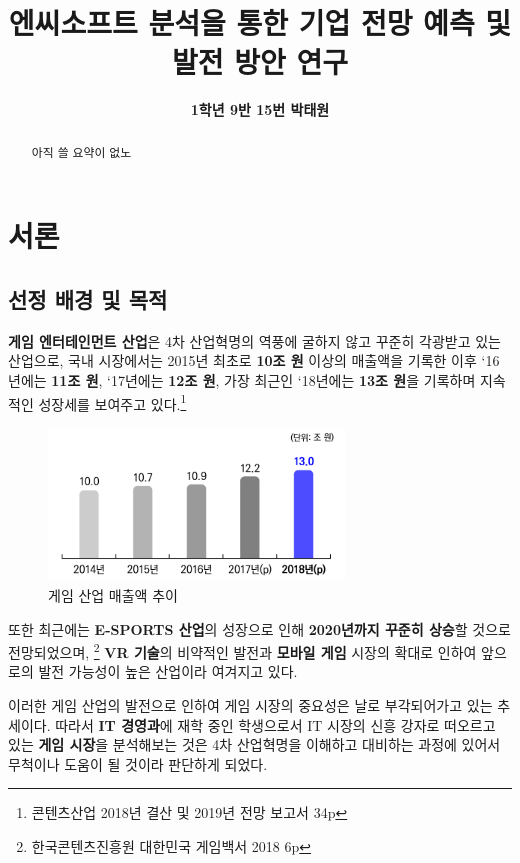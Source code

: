 \documentclass[11pt]{oblivoir}
\title{\textbf{엔씨소프트 분석을 통한 기업 전망 예측 및 발전 방안 연구}}
\author{\textbf{1학년 9반 15번 박태원}}
\begin{document}
	\begin{center}
		\maketitle
		\begin{abstract}
			아직 쓸 요약이 없노
		\end{abstract}
		\tableofcontents
		\pagebreak
	\end{center}
	
	
	\section{서론}
		\subsection{선정 배경 및 목적}
			\textbf{게임 엔터테인먼트 산업}은 4차 산업혁명의 역풍에 굴하지 않고 꾸준히 각광받고 있는 산업으로, 국내 시장에서는 2015년 최초로 \textbf{10조 원} 이상의 매출액을 기록한 이후 `16년에는 \textbf{11조 원}, `17년에는 \textbf{12조 원}, 가장 최근인 `18년에는 \textbf{13조 원}을 기록하며 지속적인 성장세를 보여주고 있다.\footnote{콘텐츠산업 2018년 결산 및 2019년 전망 보고서 34p}
			
			\begin{figure}[htbp]
				\centering
				\includegraphics[width=0.7\textwidth]{GameMaechul.png}
				\caption{게임 산업 매출액 추이}
			\end{figure}
			
			또한 최근에는 \textbf{E-SPORTS 산업}의 성장으로 인해 \textbf{2020년까지 꾸준히 상승}할 것으로 전망되었으며, \footnote{한국콘텐츠진흥원 대한민국 게임백서 2018 6p} 
			\textbf{VR 기술}의 비약적인 발전과 \textbf{모바일 게임} 시장의 확대로 인하여 앞으로의 발전 가능성이 높은 산업이라 여겨지고 있다.
			
			이러한 게임 산업의 발전으로 인하여 게임 시장의 중요성은 날로 부각되어가고 있는 추세이다. 따라서 \textbf{IT 경영과}에 재학 중인 학생으로서 IT 시장의 신흥 강자로 떠오르고 있는 \textbf{게임 시장}을 분석해보는 것은 4차 산업혁명을 이해하고 대비하는 과정에 있어서 무척이나 도움이 될 것이라 판단하게 되었다.
			
\end{document}
